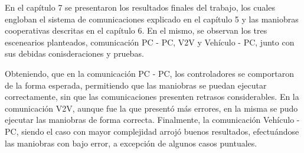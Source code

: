 En el capítulo 7 se presentaron los resultados finales del trabajo, los cuales engloban el sistema de comunicaciones explicado en el capítulo 5 y las maniobras cooperativas descritas en el capítulo 6. En el mismo, se observan los tres escenearios planteados, comunicación PC - PC, V2V y Vehículo - PC, junto con sus debidas conisderaciones y pruebas.\\

\par Obteniendo, que en la comunicación PC - PC, los controladores se comportaron de la forma esperada, permitiendo que las maniobras se puedan ejecutar correctamente, sin que las comunicaciones presenten retrasos considerables. En la comunicación V2V, aunque fue la que presentó más errores, en la misma se pudo ejecutar las maniobras de forma correcta. Finalmente, la comunicación Vehículo - PC, siendo el caso con mayor complejidad arrojó buenos resultados, efectuándose las maniobras con bajo error, a excepción de algunos casos puntuales.